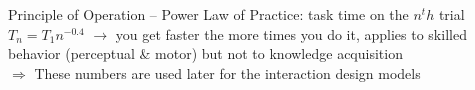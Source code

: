 Principle of Operation -- Power Law of Practice: task time on the $n^th$ trial $T_n = T_1n^{-0.4}$
$\rightarrow$ you get faster the more times you do it, applies to skilled behavior (perceptual \& motor) but not to knowledge acquisition\\
$\Rightarrow$ These numbers are used later for the interaction design models